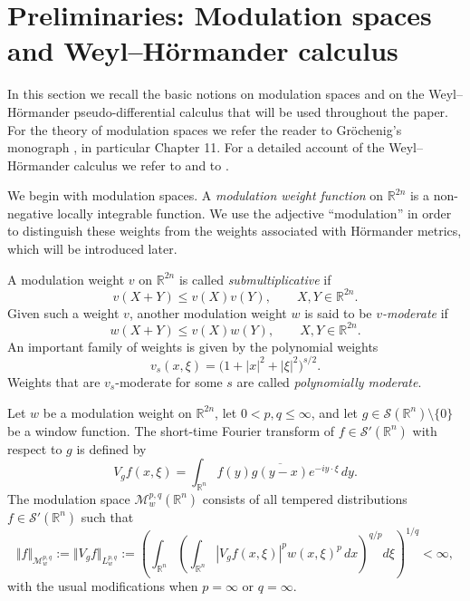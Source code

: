 \documentclass[12pt, reqno]{amsart}
\theoremstyle{definition}
\theoremstyle{remark}
\numberwithin{equation}{section}
\begin{document}
 




   
    
  
 
\section{Preliminaries: Modulation spaces and Weyl--H\"ormander calculus}
\label{preliminaries}

In this section we recall the basic notions on modulation spaces and on the Weyl--H\"ormander pseudo-differential calculus that will be used throughout the paper. For the theory of modulation spaces we refer the reader to Gr\"ochenig's monograph \cite{groch:bK}, in particular Chapter 11. For a detailed account of the Weyl--H\"ormander calculus we refer to \cite[Section 18.5]{ho:apde2} and to \cite{ho:apde2,le:book,b-l:qua,Robert1,anh:cdr2}.

We begin with modulation spaces. A {\it modulation weight function} on $\mathbb R^{2n}$ is a non-negative locally integrable function. We use the adjective ``modulation'' in order to distinguish these weights from the weights associated with H\"ormander metrics, which will be introduced later.

A modulation weight $v$ on $\mathbb R^{2n}$ is called {\it submultiplicative} if
\begin{equation}
\label{polyw0}
    v(X+Y)\leq v(X)v(Y),\qquad X,Y\in\mathbb R^{2n}.
\end{equation}
Given such a weight $v$, another modulation weight $w$ is said to be { \it $v$-moderate} if
\begin{equation}
    w(X+Y)\leq v(X)w(Y),\qquad X,Y\in\mathbb R^{2n}.
\end{equation}
An important family of weights is given by the polynomial weights
\begin{equation}
\label{polyw}
    v_s(x,\xi)=\big(1+|x|^2+|\xi|^2\big)^{s/2}.
\end{equation}
Weights that are $v_s$-moderate for some $s$ are called {\it polynomially moderate}.

Let $w$ be a modulation weight on $\mathbb R^{2n}$, let $0<p,q\leq \infty$, and let $g\in \mathcal S(\mathbb R^n)\setminus\{0\}$ be a window function. The short-time Fourier transform of $f\in\mathcal S'(\mathbb R^n)$ with respect to $g$ is defined by
\begin{equation}
\label{stft1}
    V_gf(x,\xi)
    =
    \int_{\mathbb R^n}f(y)\overline{g(y-x)}e^{-iy\cdot\xi}\,dy .
\end{equation}
The modulation space $\mathcal M_w^{p,q}(\mathbb R^n)$ consists of all tempered distributions $f\in\mathcal S'(\mathbb R^n)$ such that
\begin{equation}
\label{EQ:modul}
\Vert f\Vert_{\mathcal M_w^{p,q}}
:=
\Vert V_gf\Vert_{L_w^{p,q}}
:=
\left(
\int_{\mathbb R^n}
\left(
\int_{\mathbb R^n}
|V_gf(x,\xi)|^p w(x,\xi)^p\,dx
\right)^{q/p}
d\xi
\right)^{1/q}
<\infty ,
\end{equation}
with the usual modifications when $p=\infty$ or $q=\infty$.
\end{document}
